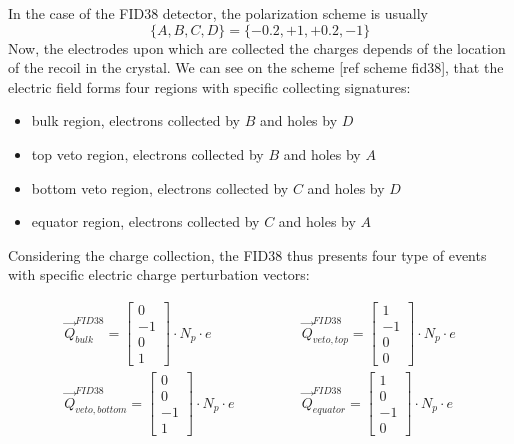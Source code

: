 In the case of the FID38 detector, the polarization scheme is usually
$$ \{ A, B, C, D \} = \{ -0.2, +1, +0.2, -1 \} $$
Now, the electrodes upon which are collected the charges depends of the location of the recoil in the crystal. We can see on the scheme [ref scheme fid38], that the electric field forms four regions with specific collecting signatures:
\begin{itemize}
	\item bulk region, electrons collected by $B$ and holes by $D$
	\item top veto region, electrons collected by $B$ and holes by $A$
	\item bottom veto region, electrons collected by $C$ and holes by $D$
	\item equator region, electrons collected by $C$ and holes by $A$
\end{itemize}
Considering the charge collection, the FID38 thus presents four type of events with specific electric charge perturbation vectors:

\begin{equation}
\label{eq:fid38-induced-charges}
\begin{array}{rr}
\vec{Q}_{bulk}^{FID38} =
\begin{bmatrix}
0 \\ -1 \\ 0 \\ 1
\end{bmatrix}
\cdot N_p \cdot e
\quad \quad
&
\quad \quad
\vec{Q}_{veto,top}^{FID38} =
\begin{bmatrix}
1 \\ -1 \\ 0 \\ 0
\end{bmatrix}
\cdot N_p \cdot e
\\
\vec{Q}_{veto,bottom}^{FID38} =
\begin{bmatrix}
0 \\ 0 \\ -1 \\ 1
\end{bmatrix}
\cdot N_p \cdot e
\quad \quad
&
\quad \quad
\vec{Q}_{equator}^{FID38} =
\begin{bmatrix}
1 \\ 0 \\ -1 \\ 0
\end{bmatrix}
\cdot N_p \cdot e
\end{array}
\end{equation}

